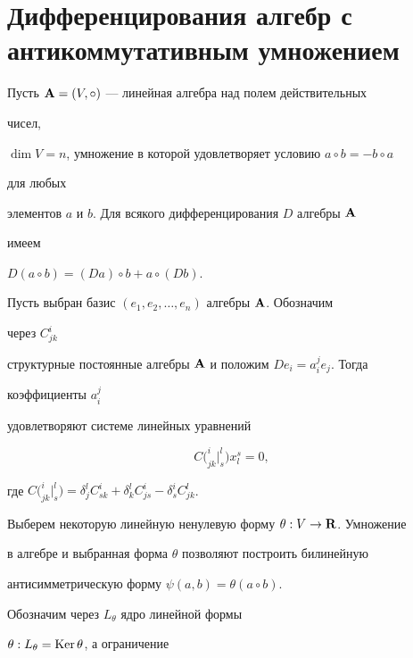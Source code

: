  


 


\section{Дифференцирования алгебр с антикоммутативным умножением} 


 


Пусть $\bold A=(V,\circ)$ --- линейная алгебра над полем действительных 


чисел,  


$\dim V=n$, умножение в которой удовлетворяет условию $a\circ b=-b\circ a$ 


для любых


элементов $a$ и $b$. Для всякого дифференцирования $D$ алгебры $\bold A$ 


имеем  


$D(a\circ b)=(Da)\circ b+a\circ(Db)$. 


 


Пусть выбран базис $(e_1,e_2,\dotsc,e_n)$ алгебры $\bold A$. Обозначим 


через $C^i_{jk}$ 


структурные постоянные алгебры $\bold A$ и положим $De_i=a^j_i e_j$. Тогда 


коэффициенты $a^j_i$ 


удовлетворяют системе линейных уравнений 


\begin{equation} 


C\big(^i_{jk} \big|^l_s \big)x^s_l=0, 


\end{equation} 


где $C\big(^i_{jk} \big|^l_s \big)=\delta^l_j C^i_{sk}+\delta^l_k 


C^i_{js}-\delta^i_s C^l_{jk}$. 


 


Выберем некоторую линейную ненулевую форму $\theta:V\to\bold R$. Умножение  


в алгебре и выбранная форма $\theta$ позволяют построить билинейную  


антисимметрическую форму $\psi(a,b)=\theta(a\circ b)$. 


 


Обозначим через $L_\theta$ ядро линейной формы 


$\theta:L_\theta=\operatorname{Ker}\theta$, а ограничение  


